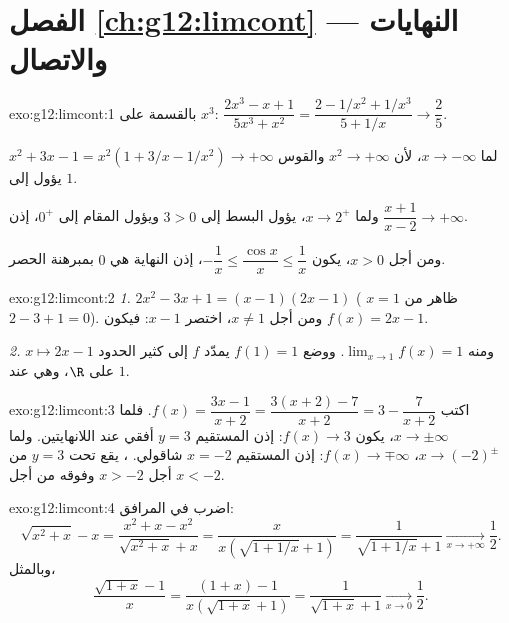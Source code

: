 \section*{الفصل \ref{ch:g12:limcont} --- النهايات والاتصال}

\begin{solution}{exo:g12:limcont:1}
بالقسمة على $x^3$:
$\dfrac{2x^3 - x + 1}{5x^3 + x^2} = \dfrac{2 - 1/x^2 + 1/x^3}{5 + 1/x}
\to \dfrac{2}{5}$.

$x^2 + 3x - 1 = x^2(1 + 3/x - 1/x^2) \to +\infty$ لما $x \to -\infty$، لأن
$x^2 \to +\infty$ والقوس يؤول إلى $1$.

ولما $x \to 2^+$، يؤول البسط إلى $3 > 0$ ويؤول المقام إلى $0^+$،
إذن $\dfrac{x+1}{x-2} \to +\infty$.

ومن أجل $x > 0$، يكون $-\dfrac1x \leq \dfrac{\cos x}{x} \leq \dfrac1x$، إذن النهاية
هي $0$ بمبرهنة الحصر.
\end{solution}

\begin{solution}{exo:g12:limcont:2}
\emph{1.} $2x^2 - 3x + 1 = (x-1)(2x-1)$ ( $x=1$ ظاهر من
$2 - 3 + 1 = 0$). ومن أجل $x \neq 1$، اختصر $x - 1$: فيكون $f(x) = 2x - 1$.

\emph{2.} ومنه $\lim_{x\to1} f(x) = 1$. ووضع $f(1) = 1$ يمدّد $f$ إلى
 كثير الحدود $x \mapsto 2x-1$ على $\R$، وهي  عند $1$.
\end{solution}

\begin{solution}{exo:g12:limcont:3}
اكتب $f(x) = \dfrac{3x - 1}{x + 2} = \dfrac{3(x+2) - 7}{x+2}
= 3 - \dfrac{7}{x+2}$. فلما $x \to \pm\infty$، يكون $f(x) \to 3$: إذن المستقيم $y = 3$
 أفقي عند اللانهايتين. ولما $x \to (-2)^\pm$،
$f(x) \to \mp\infty$: إذن المستقيم $x = -2$  شاقولي. 
، يقع تحت $y=3$ من أجل $x > -2$ وفوقه من أجل $x < -2$.
\end{solution}

\begin{solution}{exo:g12:limcont:4}
اضرب في المرافق:
\[
\sqrt{x^2 + x} - x = \frac{x^2 + x - x^2}{\sqrt{x^2+x} + x}
= \frac{x}{x\left(\sqrt{1 + 1/x} + 1\right)}
= \frac{1}{\sqrt{1 + 1/x} + 1}
\xrightarrow[x\to+\infty]{} \frac{1}{2}.
\]
وبالمثل،
\[
\frac{\sqrt{1+x} - 1}{x} = \frac{(1+x) - 1}{x\left(\sqrt{1+x} + 1\right)}
= \frac{1}{\sqrt{1+x} + 1} \xrightarrow[x\to0]{} \frac{1}{2}.
\]
\end{solution}

